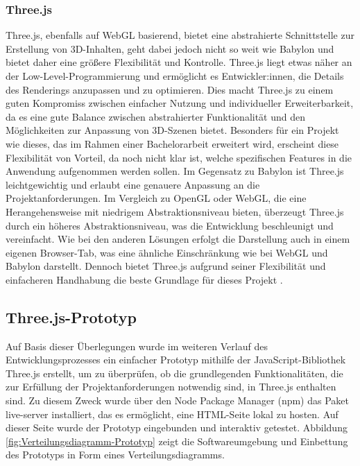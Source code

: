 \subsubsection{Three.js}
Three.js, ebenfalls auf WebGL basierend, bietet eine abstrahierte Schnittstelle zur Erstellung von 3D-Inhalten,
geht dabei jedoch nicht so weit wie Babylon und bietet daher eine größere Flexibilität und Kontrolle.
Three.js liegt etwas näher an der Low-Level-Programmierung und ermöglicht es Entwickler:innen, die Details des Renderings anzupassen und zu optimieren.
Dies macht Three.js zu einem guten Kompromiss zwischen einfacher Nutzung und individueller Erweiterbarkeit,
da es eine gute Balance zwischen abstrahierter Funktionalität und den Möglichkeiten zur Anpassung von 3D-Szenen bietet.
Besonders für ein Projekt wie dieses, das im Rahmen einer Bachelorarbeit erweitert wird, erscheint diese Flexibilität von Vorteil,
da noch nicht klar ist, welche spezifischen Features in die Anwendung aufgenommen werden sollen. Im Gegensatz zu Babylon ist Three.js
leichtgewichtig und erlaubt eine genauere Anpassung an die Projektanforderungen.
Im Vergleich zu OpenGL oder WebGL, die eine Herangehensweise mit niedrigem Abstraktionsniveau bieten, überzeugt Three.js durch ein höheres Abstraktionsniveau,
was die Entwicklung beschleunigt und vereinfacht.
Wie bei den anderen Lösungen erfolgt die Darstellung auch in einem eigenen Browser-Tab, was eine ähnliche Einschränkung wie bei WebGL und Babylon darstellt.
Dennoch bietet Three.js aufgrund seiner Flexibilität und einfacheren Handhabung die beste Grundlage für dieses Projekt .

\subsection{Three.js-Prototyp}
Auf Basis dieser Überlegungen wurde im weiteren Verlauf des Entwicklungsprozesses ein einfacher Prototyp mithilfe der JavaScript-Bibliothek Three.js erstellt,
um zu überprüfen, ob die grundlegenden Funktionalitäten, die zur Erfüllung der Projektanforderungen notwendig sind, in Three.js enthalten sind.
Zu diesem Zweck wurde über den Node Package Manager (npm) das Paket live-server installiert, das es ermöglicht, eine HTML-Seite lokal zu hosten.
Auf dieser Seite wurde der Prototyp eingebunden und interaktiv getestet.
Abbildung \ref{fig:Verteilungsdiagramm-Prototyp} zeigt die Softwareumgebung und Einbettung des Prototyps in Form eines Verteilungsdiagramms.
\vspace{1em}

